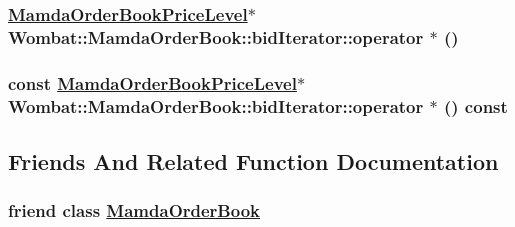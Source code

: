 \hypertarget{classWombat_1_1MamdaOrderBook_1_1bidIterator_159db877b3d19320feed17a490beae4a}{
\subsubsection[operator $\ast$]{\setlength{\rightskip}{0pt plus 5cm}\hyperlink{classWombat_1_1MamdaOrderBookPriceLevel}{Mamda\-Order\-Book\-Price\-Level}$\ast$ Wombat::Mamda\-Order\-Book::bid\-Iterator::operator $\ast$ ()}}
\label{classWombat_1_1MamdaOrderBook_1_1bidIterator_159db877b3d19320feed17a490beae4a}


\hypertarget{classWombat_1_1MamdaOrderBook_1_1bidIterator_b8780fda39a421ff523483b7599e7427}{
\subsubsection[operator $\ast$]{\setlength{\rightskip}{0pt plus 5cm}const \hyperlink{classWombat_1_1MamdaOrderBookPriceLevel}{Mamda\-Order\-Book\-Price\-Level}$\ast$ Wombat::Mamda\-Order\-Book::bid\-Iterator::operator $\ast$ () const}}
\label{classWombat_1_1MamdaOrderBook_1_1bidIterator_b8780fda39a421ff523483b7599e7427}




\subsection{Friends And Related Function Documentation}
\hypertarget{classWombat_1_1MamdaOrderBook_1_1bidIterator_51cb271c9914c74f99c60cb638c26be7}{
\subsubsection[MamdaOrderBook]{\setlength{\rightskip}{0pt plus 5cm}friend class \hyperlink{classWombat_1_1MamdaOrderBook}{Mamda\-Order\-Book}}}
\label{classWombat_1_1MamdaOrderBook_1_1bidIterator_51cb271c9914c74f99c60cb638c26be7}




